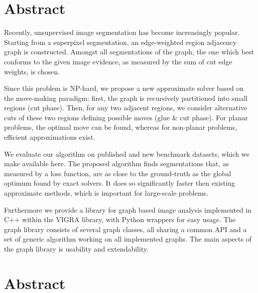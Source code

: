 
\begingroup
\let\clearpage\relax
\let\cleardoublepage\relax
\let\cleardoublepage\relax

\chapter*{Abstract} %

Recently, unsupervised image segmentation has become increasingly
popular.
Starting from a superpixel segmentation, an edge-weighted region
adjacency graph is constructed. Amongst all
segmentations of the graph,
the one which best conforms to the given image
evidence, as measured by the sum of cut edge weights,
is chosen.

Since this problem is NP-hard, we propose 
a new approximate solver based on the move-making paradigm:
first, the graph is recursively partitioned into
small regions (cut phase).
%
Then, for any two adjacent 
regions, we consider alternative cuts of these two regions
defining possible moves (glue \& cut phase).
%
For planar problems, the optimal move can be found, whereas
for non-planar problems, efficient approximations exist. 

We evaluate our algorithm on published and
new benchmark datasets, which we make available here.
%
The proposed algorithm finds segmentations that,
as measured by a loss function, are as close to
the ground-truth as the global optimum found by exact solvers.
%
It does so significantly faster then existing approximate methods,
which is important for large-scale problems.

Furthermore we provide a library for graph based image analysis implemented
in C++ within the  VIGRA library, with Python wrappers
for easy usage.
The graph library consists of several graph classes, all 
sharing a common API and a set of generic algorithm working
on all implemented graphs.
The main aspects of the graph library is usability and extendability.


\endgroup			

\vfill



\cleardoublepage
\begingroup
\let\clearpage\relax
\let\cleardoublepage\relax
\let\cleardoublepage\relax


\chapter*{Abstract} %

